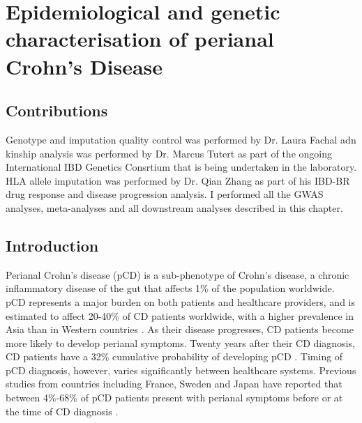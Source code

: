 
\chapter{Epidemiological and genetic characterisation of perianal Crohn's Disease}

\ifpdf
    \graphicspath{{Chapter4/Figs/Raster/}{Chapter4/Figs/PDF/}{Chapter4/Figs/}}
\else
    \graphicspath{{Chapter4/Figs/Vector/}{Chapter4/Figs/}}
\fi
\section{Contributions}
Genotype and imputation quality control was performed by Dr. Laura Fachal adn kinship analysis was performed by Dr. Marcus Tutert as part of the ongoing International IBD Genetics Consrtium that is being undertaken in the laboratory. HLA allele imputation was performed by Dr. Qian Zhang as part of his IBD-BR drug response and disease progression analysis. I performed all the GWAS analyses, meta-analyses and all downstream analyses described in this chapter.
\section{Introduction}
Perianal Crohn's disease (pCD) is a sub-phenotype of Crohn's disease, a chronic inflammatory disease of the gut that affects 1\% of the population worldwide. pCD represents a major burden on both patients and healthcare providers, and is estimated to affect 20-40\% of CD patients worldwide, with a higher prevalence in Asia than in Western countries \cite{Ng2016-al}. As their disease progresses, CD patients become more likely to develop perianal symptoms. Twenty years after their CD diagnosis, CD patients have a 32\% cumulative probability of developing pCD \cite{Brochard2022-hx}. Timing of pCD diagnosis, however, varies significantly between healthcare systems. Previous studies from countries including France, Sweden and Japan have reported that between 4\%-68\% of pCD patients present with perianal symptoms before or at the time of CD diagnosis \cite{Mizushima2021-hk,Pogacnik2019-aj,Wils2021-ao}.\\

